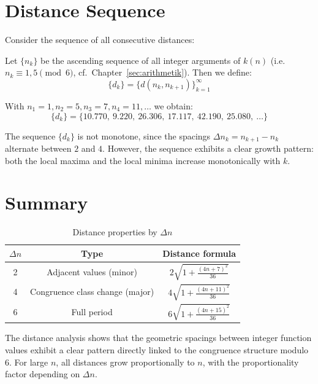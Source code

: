\section{Distance Sequence}

Consider the sequence of all consecutive distances:

\begin{definition}
Let $\{n_k\}$ be the ascending sequence of all integer arguments of $k(n)$
(i.e.\ $n_k \equiv 1, 5 \pmod{6}$, cf.\ Chapter~\ref{sec:arithmetik}).
Then we define:
\begin{equation}
\{d_k\} = \{d(n_k, n_{k+1})\}_{k=1}^{\infty}
\end{equation}
\end{definition}

\begin{example}
With $n_1 = 1, n_2 = 5, n_3 = 7, n_4 = 11, \ldots$ we obtain:
\[
\{d_k\} = \{10.770,\ 9.220,\ 26.306,\ 17.117,\ 42.190,\ 25.080,\ \ldots\}
\]
\end{example}

\begin{remark}[Irregularity]
The sequence $\{d_k\}$ is not monotone, since the spacings
$\Delta n_k = n_{k+1} - n_k$ alternate between $2$ and $4$. However, the
sequence exhibits a clear growth pattern: both the local maxima and the local
minima increase monotonically with $k$.
\end{remark}

\section{Summary}

\begin{table}[H]
\centering
\caption{Distance properties by $\Delta n$}
\begin{tabular}{ccc}
\toprule
$\Delta n$ & Type & Distance formula \\
\midrule
2 & Adjacent values (minor) & $2\sqrt{1 + \frac{(4n+7)^2}{36}}$ \\
4 & Congruence class change (major) & $4\sqrt{1 + \frac{(4n+11)^2}{36}}$ \\
6 & Full period & $6\sqrt{1 + \frac{(4n+15)^2}{36}}$ \\
\bottomrule
\end{tabular}
\end{table}

\begin{remark}[Significance]
The distance analysis shows that the geometric spacings between integer
function values exhibit a clear pattern directly linked to the congruence
structure modulo~$6$. For large $n$, all distances grow proportionally to $n$,
with the proportionality factor depending on $\Delta n$.
\end{remark}
